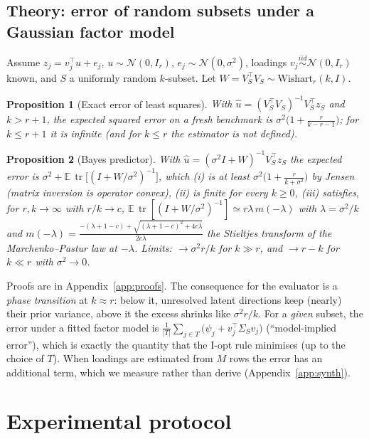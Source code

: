 \documentclass{article}
\newtheorem{proposition}{Proposition}
\newcommand{\E}{\mathbb{E}}
\newcommand{\tr}{\operatorname{tr}}
\begin{document}
\subsection{Theory: error of random subsets under a Gaussian factor model}\label{sec:theory}
Assume $z_j=v_j^\top u+e_j$, $u\sim\mathcal N(0,I_r)$, $e_j\sim\mathcal N(0,\sigma^2)$, loadings $v_j\overset{iid}{\sim}\mathcal N(0,I_r)$ known, and $S$ a uniformly random $k$-subset. Let $W=V_S^\top V_S\sim\mathrm{Wishart}_r(k,I)$.
\begin{proposition}[Exact error of least squares]\label{prop:ols}
With $\hat u=(V_S^\top V_S)^{-1}V_S^\top z_S$ and $k>r+1$, the expected squared error on a fresh benchmark is $\sigma^2\bigl(1+\tfrac{r}{k-r-1}\bigr)$; for $k\le r+1$ it is infinite (and for $k\le r$ the estimator is not defined).
\end{proposition}
\begin{proposition}[Bayes predictor]\label{prop:bayes}
With $\hat u=(\sigma^2I+W)^{-1}V_S^\top z_S$ the expected error is $\sigma^2+\E\,\tr\bigl[(I+W/\sigma^2)^{-1}\bigr]$, which (i) is at least $\sigma^2\bigl(1+\tfrac{r}{k+\sigma^2}\bigr)$ by Jensen (matrix inversion is operator convex), (ii) is finite for every $k\ge0$, (iii) satisfies, for $r,k\to\infty$ with $r/k\to c$, $\E\,\tr[(I+W/\sigma^2)^{-1}]\simeq r\lambda\,m(-\lambda)$ with $\lambda=\sigma^2/k$ and $m(-\lambda)=\frac{-(\lambda+1-c)+\sqrt{(\lambda+1-c)^2+4c\lambda}}{2c\lambda}$ the Stieltjes transform of the Marchenko--Pastur law \citep{marchenko1967distribution} at $-\lambda$. Limits: $\to\sigma^2r/k$ for $k\gg r$, and $\to r-k$ for $k\ll r$ with $\sigma^2\to0$.
\end{proposition}
Proofs are in Appendix~\ref{app:proofs}. The consequence for the evaluator is a \emph{phase transition} at $k\approx r$: below it, unresolved latent directions keep (nearly) their prior variance, above it the excess shrinks like $\sigma^2r/k$. For a \emph{given} subset, the error under a fitted factor model is $\frac1{|T|}\sum_{j\in T}\bigl(\psi_j+v_j^\top\Sigma_S v_j\bigr)$ (``model-implied error''), which is exactly the quantity that the I-opt rule minimises (up to the choice of $T$). When loadings are estimated from $M$ rows the error has an additional term, which we measure rather than derive (Appendix~\ref{app:synth}).

\section{Experimental protocol}\label{sec:protocol}
\end{document}
